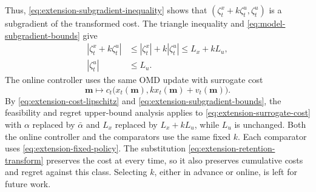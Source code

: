 \documentclass[journal]{IEEEtran}
\theoremstyle{remark}
\begin{document}
Thus, \eqref{eq:extension-subgradient-inequality} shows that
$(\zeta_t^x+k\zeta_t^u,\zeta_t^u)$ is a subgradient of the transformed cost.
The triangle inequality and \eqref{eq:model-subgradient-bounds} give
\begin{equation}
\label{eq:extension-subgradient-bounds}
\begin{aligned}
|\zeta_t^x+k\zeta_t^u|
&\le|\zeta_t^x|+k|\zeta_t^u|\le L_x+kL_u,\\
|\zeta_t^u|&\le L_u.
\end{aligned}
\end{equation}
The online controller uses the same OMD update with surrogate cost
\begin{equation}
\label{eq:extension-surrogate-cost}
\mathbf{m}\mapsto
c_t\bigl(x_t(\mathbf{m}),kx_t(\mathbf{m})+v_t(\mathbf{m})\bigr).
\end{equation}
By \eqref{eq:extension-cost-lipschitz} and
\eqref{eq:extension-subgradient-bounds}, the feasibility and regret
upper-bound analysis applies to \eqref{eq:extension-surrogate-cost} with $\alpha$
replaced by $\bar\alpha$ and $L_x$ replaced by $L_x+kL_u$, while $L_u$ is
unchanged.
Both the online controller and the comparators use the same fixed $k$.
Each comparator uses \eqref{eq:extension-fixed-policy}.
The substitution \eqref{eq:extension-retention-transform} preserves the cost
at every time, so it also preserves
cumulative costs and regret against this class. Selecting $k$, either in
advance or online, is left for future work.
\end{document}

